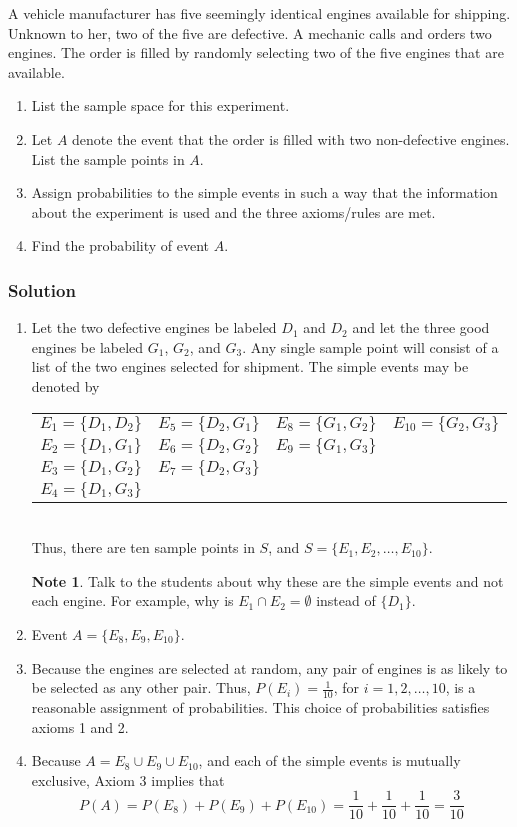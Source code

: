 \documentclass[11pt]{article}
\theoremstyle{definition}
\newtheorem{note}{Note}
\begin{document}
A vehicle manufacturer has five seemingly identical engines available for shipping. Unknown to her, two of the five are defective. A mechanic calls and orders two engines. The order is filled by randomly selecting two of the five engines that are available.

\begin{enumerate}
	\item List the sample space for this experiment.
	\item Let $A$ denote the event that the order is filled with two non-defective engines. List the sample points in $A$.
	\item Assign probabilities to the simple events in such a way that the information about the experiment is used and the three axioms/rules are met.
	\item Find the probability of event $A$.
\end{enumerate}

\subsubsection*{Solution}

\begin{enumerate}
	\item Let the two defective engines be labeled $D_1$ and $D_2$ and let the three good engines be labeled $G_1$, $G_2$, and $G_3$. Any single sample point will consist of a list of the two engines selected for shipment. The simple events may be denoted by \\
	\begin{tabular}{cccc}
		$E_1 = \{D_1, D_2\}$ & $E_5 = \{D_2, G_1\}$ & $E_8 = \{G_1, G_2\}$ & $E_{10} = \{G_2, G_3\}$  \\
		$E_2 = \{D_1, G_1\}$ & $E_6 = \{D_2, G_2\}$ & $E_9 = \{G_1, G_3\}$ &  \\
		$E_3 = \{D_1, G_2\}$ & $E_7 = \{D_2, G_3\}$ &  &  \\
		$E_4 = \{D_1, G_3\}$ &  &  &  \\
	\end{tabular} \\
	Thus, there are ten sample points in $S$, and $S = \{E_1, E_2, \ldots, E_{10}\}$.
	\begin{note}
		Talk to the students about why these are the simple events and not each engine. For example, why is $E_1 \cap E_2 = \emptyset$ instead of $\{D_1\}$.
	\end{note}
	\item Event $A = \{E_8, E_9, E_{10}\}$.
	\item Because the engines are selected at random, any pair of engines is as likely to be selected as any other pair. Thus, $P(E_i) = \frac{1}{10}$, for $i=1, 2, \ldots, 10$, is a reasonable assignment of probabilities. This choice of probabilities satisfies axioms 1 and 2.
	\item Because $A = E_8 \cup E_9 \cup E_{10}$, and each of the simple events is mutually exclusive, Axiom 3 implies that
	$$
		P(A) = P(E_8) + P(E_9) + P(E_{10}) = \frac{1}{10} + \frac{1}{10} + \frac{1}{10} = \frac{3}{10}
	$$
\end{enumerate}
\end{document}
